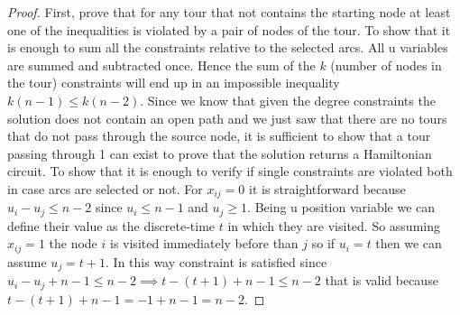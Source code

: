 \begin{proof}
    First, prove that for any tour that not contains the starting node at least
    one of the inequalities is violated by a pair of nodes of the tour. To show
    that it is enough to sum all the constraints relative to the selected arcs.
    All u variables are summed and subtracted once. Hence the sum of the $k$
    (number of nodes in the tour) constraints will end up in an impossible
    inequality $k(n - 1) \leq k(n - 2)$. Since we know that given the degree
    constraints the solution does not contain an open path and we just saw that
    there are no tours that do not pass through the source node, it is
    sufficient to show that a tour passing through 1 can exist to prove that
    the solution returns a Hamiltonian circuit. To show that it is enough to
    verify if single constraints are violated both in case arcs are selected or
    not. For $x_{ij} = 0$ it is straightforward because $u_i - u_j \leq n - 2$
    since $u_i \leq n - 1$ and $u_j \geq 1$. Being u position variable we can
    define their value as the discrete-time $t$ in which they are visited. So
    assuming $x_{ij} = 1$ the node $i$ is visited immediately before than $j$
    so if $u_i = t$ then we can assume $u_j = t + 1$. In this way constraint is
    satisfied since $u_i - u_j + n - 1 \leq n - 2 \implies t - (t + 1) + n - 1
    \leq n - 2$ that is valid because $t - (t + 1) + n - 1 = -1 + n - 1 = n -
    2$.
\end{proof}

